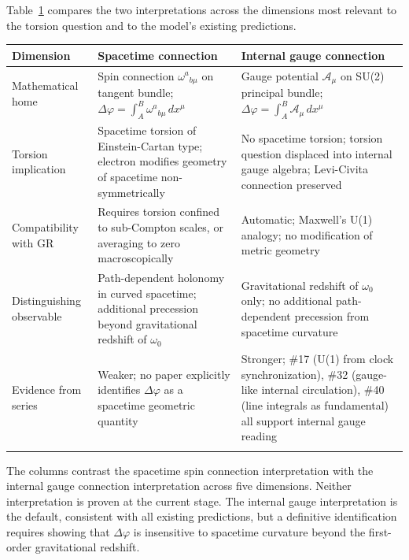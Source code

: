 \documentclass[%
 reprint,
 amsmath,amssymb,
 aps,
 prb,
]{revtex4-2}
\numberwithin{equation}{section}
\begin{document}
Table~\ref{tab:dichotomy} compares the two interpretations across the dimensions most relevant to the torsion question and to the model's existing predictions.

\begin{table}[t!]
\label{tab:dichotomy}
\renewcommand{\arraystretch}{1.5}
\setlength{\tabcolsep}{7pt}
\begin{tabular}{p{4.8cm}p{5.8cm}p{5.9cm}}
\toprule
\textbf{Dimension} & \textbf{Spacetime connection} & \textbf{Internal gauge connection} \\
\midrule
Mathematical home
& Spin connection $\omega^a{}_{b\mu}$ on tangent bundle; $\Delta\varphi = \int_A^B \omega^a{}_{b\mu}\,dx^\mu$
& Gauge potential $\mathcal{A}_\mu$ on SU(2) principal bundle; $\Delta\varphi = \int_A^B \mathcal{A}_\mu\,dx^\mu$ \\
\addlinespace[0.3cm]
Torsion implication
& Spacetime torsion of Einstein-Cartan type; electron modifies geometry of spacetime non-symmetrically
& No spacetime torsion; torsion question displaced into internal gauge algebra; Levi-Civita connection preserved \\
\addlinespace[0.3cm]
Compatibility with GR
& Requires torsion confined to sub-Compton scales, or averaging to zero macroscopically
& Automatic; Maxwell's U(1) analogy; no modification of metric geometry \\
\addlinespace[0.3cm]
Distinguishing observable
& Path-dependent holonomy in curved spacetime; additional precession beyond gravitational redshift of $\omega_0$
& Gravitational redshift of $\omega_0$ only; no additional path-dependent precession from spacetime curvature \\
\addlinespace[0.3cm]
Evidence from series
& Weaker; no paper explicitly identifies $\Delta\varphi$ as a spacetime geometric quantity
& Stronger; \#17 (U(1) from clock synchronization), \#32 (gauge-like internal circulation), \#40 (line integrals as fundamental) all support internal gauge reading \\
\addlinespace[0.2cm]
\bottomrule
\end{tabular}
\vspace{0.2cm}
\begin{minipage}{0.95\textwidth}
\justifying\footnotesize
The columns contrast the spacetime spin connection interpretation with the internal gauge connection interpretation across five dimensions. Neither interpretation is proven at the current stage. The internal gauge interpretation is the default, consistent with all existing predictions, but a definitive identification requires showing that $\Delta\varphi$ is insensitive to spacetime curvature beyond the first-order gravitational redshift.
\end{minipage}
\end{table}
\end{document}
